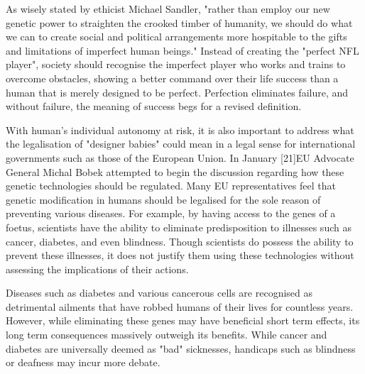    As wisely stated by ethicist Michael Sandler, "rather than employ our
   new genetic power to straighten the crooked timber of humanity, we
   should do what we can to create social and political arrangements more
   hospitable to the gifts and limitations of imperfect human beings."
   Instead of creating the "perfect NFL player", society should recognise
   the imperfect player who works and trains to overcome obstacles,
   showing a better command over their life success than a human that is
   merely designed to be perfect. Perfection eliminates failure, and
   without failure, the meaning of success begs for a revised definition.

   With human's individual autonomy at risk, it is also important to
   address what the legalisation of "designer babies" could mean in a
   legal sense for international governments such as those of the European
   Union. In January  [21]EU Advocate General Michal Bobek attempted to
   begin the discussion regarding how these genetic technologies should be
   regulated. Many EU representatives feel that genetic modification in
   humans should be legalised for the sole reason of preventing various
   diseases. For example, by having access to the genes of a foetus,
   scientists have the ability to eliminate predisposition to illnesses
   such as cancer, diabetes, and even blindness. Though scientists do
   possess the ability to prevent these illnesses, it does not justify
   them using these technologies without assessing the implications of
   their actions.

   Diseases such as diabetes and various cancerous cells are recognised as
   detrimental ailments that have robbed humans of their lives for
   countless years. However, while eliminating these genes may have
   beneficial short term effects, its long term consequences massively
   outweigh its benefits. While cancer and diabetes are universally deemed
   as "bad" sicknesses, handicaps such as blindness or deafness may incur
   more debate.

